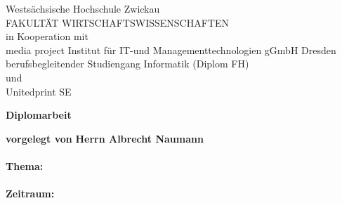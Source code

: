 \begin {titlepage}
\begin {center}
\small{
	Westsächsische Hochschule Zwickau \\
	FAKULTÄT  WIRTSCHAFTSWISSENSCHAFTEN\\
	\vspace{7pt}
	in Kooperation mit\\
	\vspace{7pt}
	media project Institut für IT-und Managementtechnologien gGmbH Dresden\\
    berufsbegleitender Studiengang Informatik (Diplom FH)\\
    und\\
    Unitedprint SE\\
}
\vspace{50pt}

\LARGE{\textbf{Diplomarbeit}}

\vspace{8pt}
\Large{\textbf{vorgelegt von}}
\Large{\textbf{Herrn Albrecht Naumann}}
\end{center}
\vspace{10pt}
\paragraph{Thema:}
\large{
\begin{center}
\end{center}
}
\paragraph{Zeitraum:}
\large{
\begin{center}
\end{center}
}
\end{titlepage}
